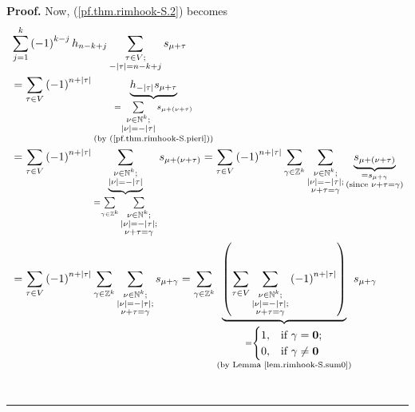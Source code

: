 \documentclass[numbers=enddot,12pt,final,onecolumn,notitlepage]{scrartcl}%
\theoremstyle{definition}
\newenvironment{proof}[1][Proof]{\noindent\textbf{#1.} }{\ \rule{0.5em}{0.5em}}
\let\sumnonlimits\sum
\renewcommand{\sum}{\sumnonlimits\limits}
\begin{document}
\begin{proof}
Now, (\ref{pf.thm.rimhook-S.2}) becomes%
\begin{align*}
&  \sum_{j=1}^{k}\left(  -1\right)  ^{k-j}h_{n-k+j}\sum_{\substack{\tau\in
V;\\-\left\vert \tau\right\vert =n-k+j}}s_{\mu+\tau}\\
&  =\sum_{\tau\in V}\left(  -1\right)  ^{n+\left\vert \tau\right\vert
}\underbrace{h_{-\left\vert \tau\right\vert }s_{\mu+\tau}}_{\substack{=\sum
_{\substack{\nu\in\mathbb{N}^{k};\\\left\vert \nu\right\vert =-\left\vert
\tau\right\vert }}s_{\mu+\left(  \nu+\tau\right)  }\\\text{(by
(\ref{pf.thm.rimhook-S.pieri}))}}}\\
&  =\sum_{\tau\in V}\left(  -1\right)  ^{n+\left\vert \tau\right\vert
}\underbrace{\sum_{\substack{\nu\in\mathbb{N}^{k};\\\left\vert \nu\right\vert
=-\left\vert \tau\right\vert }}}_{=\sum_{\gamma\in\mathbb{Z}^{k}}%
\sum_{\substack{\nu\in\mathbb{N}^{k};\\\left\vert \nu\right\vert =-\left\vert
\tau\right\vert ;\\\nu+\tau=\gamma}}}s_{\mu+\left(  \nu+\tau\right)  }%
=\sum_{\tau\in V}\left(  -1\right)  ^{n+\left\vert \tau\right\vert }%
\sum_{\gamma\in\mathbb{Z}^{k}}\sum_{\substack{\nu\in\mathbb{N}^{k}%
;\\\left\vert \nu\right\vert =-\left\vert \tau\right\vert ;\\\nu+\tau=\gamma
}}\underbrace{s_{\mu+\left(  \nu+\tau\right)  }}_{\substack{=s_{\mu+\gamma
}\\\text{(since }\nu+\tau=\gamma\text{)}}}\\
&  =\sum_{\tau\in V}\left(  -1\right)  ^{n+\left\vert \tau\right\vert }%
\sum_{\gamma\in\mathbb{Z}^{k}}\sum_{\substack{\nu\in\mathbb{N}^{k}%
;\\\left\vert \nu\right\vert =-\left\vert \tau\right\vert ;\\\nu+\tau=\gamma
}}s_{\mu+\gamma}=\sum_{\gamma\in\mathbb{Z}^{k}}\underbrace{\left(  \sum
_{\tau\in V}\sum_{\substack{\nu\in\mathbb{N}^{k};\\\left\vert \nu\right\vert
=-\left\vert \tau\right\vert ;\\\nu+\tau=\gamma}}\left(  -1\right)
^{n+\left\vert \tau\right\vert }\right)  }_{\substack{=%
\begin{cases}
1, & \text{if }\gamma=\mathbf{0};\\
0, & \text{if }\gamma\neq\mathbf{0}%
\end{cases}
\\\text{(by Lemma \ref{lem.rimhook-S.sum0})}}}s_{\mu+\gamma}\\

\end{align*}
\end{proof}
\end{document}
